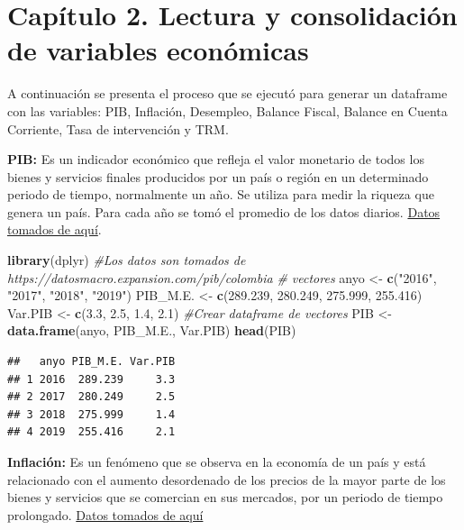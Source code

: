 \documentclass[
  11pt,
  a4paper,
]{book}
\newenvironment{Shaded}{\begin{snugshade}}{\end{snugshade}}
\newcommand{\CommentTok}[1]{\textcolor[rgb]{0.56,0.35,0.01}{\textit{#1}}}
\newcommand{\FloatTok}[1]{\textcolor[rgb]{0.00,0.00,0.81}{#1}}
\newcommand{\KeywordTok}[1]{\textcolor[rgb]{0.13,0.29,0.53}{\textbf{#1}}}
\newcommand{\NormalTok}[1]{#1}
\newcommand{\StringTok}[1]{\textcolor[rgb]{0.31,0.60,0.02}{#1}}
\begin{document}
\hypertarget{capuxedtulo-2.-lectura-y-consolidaciuxf3n-de-variables-econuxf3micas}{%
\chapter{Capítulo 2. Lectura y consolidación de variables
económicas}\label{capuxedtulo-2.-lectura-y-consolidaciuxf3n-de-variables-econuxf3micas}}

A continuación se presenta el proceso que se ejecutó para generar un
dataframe con las variables: PIB, Inflación, Desempleo, Balance Fiscal,
Balance en Cuenta Corriente, Tasa de intervención y TRM.

\textbf{PIB:} Es un indicador económico que refleja el valor monetario
de todos los bienes y servicios finales producidos por un país o región
en un determinado periodo de tiempo, normalmente un año. Se utiliza para
medir la riqueza que genera un país. Para cada año se tomó el promedio
de los datos diarios.
\href{https://datosmacro.expansion.com/pib/colombia}{Datos tomados de
aquí}.

\begin{Shaded}
\begin{Highlighting}[]
\KeywordTok{library}\NormalTok{(dplyr)}
\CommentTok{#Los datos son tomados de https://datosmacro.expansion.com/pib/colombia}
\CommentTok{# vectores }
\NormalTok{anyo <-}\StringTok{ }\KeywordTok{c}\NormalTok{(}\StringTok{"2016"}\NormalTok{, }\StringTok{"2017"}\NormalTok{, }\StringTok{"2018"}\NormalTok{, }\StringTok{"2019"}\NormalTok{)}
\NormalTok{PIB_M.E. <-}\StringTok{ }\KeywordTok{c}\NormalTok{(}\FloatTok{289.239}\NormalTok{, }\FloatTok{280.249}\NormalTok{, }\FloatTok{275.999}\NormalTok{, }\FloatTok{255.416}\NormalTok{)}
\NormalTok{Var.PIB <-}\StringTok{ }\KeywordTok{c}\NormalTok{(}\FloatTok{3.3}\NormalTok{, }\FloatTok{2.5}\NormalTok{, }\FloatTok{1.4}\NormalTok{, }\FloatTok{2.1}\NormalTok{)}
\CommentTok{#Crear dataframe de vectores}
\NormalTok{PIB <-}\StringTok{ }\KeywordTok{data.frame}\NormalTok{(anyo, PIB_M.E., Var.PIB)}
\KeywordTok{head}\NormalTok{(PIB)}
\end{Highlighting}
\end{Shaded}

\begin{verbatim}
##   anyo PIB_M.E. Var.PIB
## 1 2016  289.239     3.3
## 2 2017  280.249     2.5
## 3 2018  275.999     1.4
## 4 2019  255.416     2.1
\end{verbatim}

\textbf{Inflación:} Es un fenómeno que se observa en la economía de un
país y está relacionado con el aumento desordenado de los precios de la
mayor parte de los bienes y servicios que se comercian en sus mercados,
por un periodo de tiempo prolongado.
\href{https://es.wikipedia.org/wiki/Anexo:Variaci\%C3\%B3n_de_la_inflaci\%C3\%B3n_de_Colombia_desde_1946}{Datos
tomados de aquí}
\end{document}
